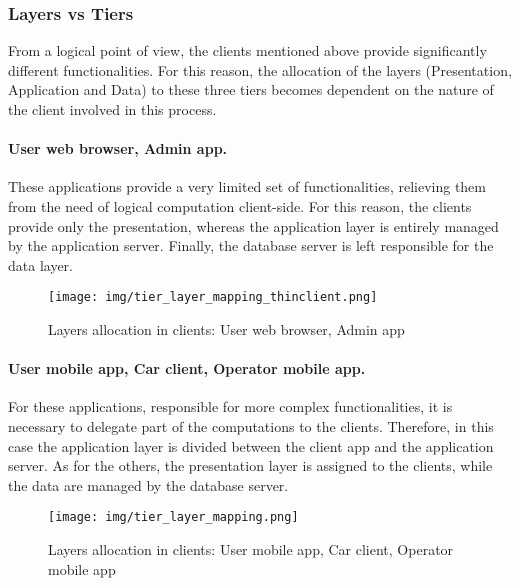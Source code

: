 \subsubsection{Layers vs Tiers}
	From a logical point of view, the clients mentioned above provide significantly different functionalities. For this reason, the allocation of the layers (Presentation, Application and Data) to these three tiers becomes dependent on the nature of the client involved in this process.

	\paragraph{User web browser, Admin app.} These applications provide a very limited set of functionalities, relieving them from the need of logical computation client-side. For this reason, the clients provide only the presentation, whereas the application layer is entirely managed by the application server. Finally, the database server is left responsible for the data layer.
		\begin{figure}[h]
			\texttt{[image: img/tier\_layer\_mapping\_thinclient.png]}
			\caption{Layers allocation in clients: User web browser, Admin app}
		\end{figure}

	\paragraph{User mobile app, Car client, Operator mobile app.} For these applications, responsible for more complex functionalities, it is necessary to delegate part of the computations to the clients. Therefore, in this case the application layer is divided between the client app and the application server. As for the others, the presentation layer is assigned to the clients, while the data are managed by the database server.
		\begin{figure}[h]
			\texttt{[image: img/tier\_layer\_mapping.png]}
			\caption{Layers allocation in clients: User mobile app, Car client, Operator mobile app}
		\end{figure}
\FloatBarrier
